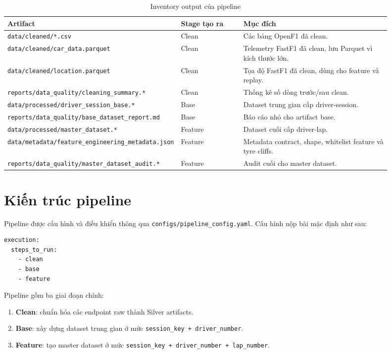 \documentclass[conference]{IEEEtran}
\begin{document}
\begin{table}[htbp]
\caption{Inventory output của pipeline}
\label{tab:outputs}
\centering
\begin{tabular}{p{0.28\linewidth}p{0.18\linewidth}p{0.44\linewidth}}
\toprule
Artifact & Stage tạo ra & Mục đích \\
\midrule
\texttt{data/cleaned/*.csv} & Clean & Các bảng OpenF1 đã clean. \\
\texttt{data/cleaned/car\_data.parquet} & Clean & Telemetry FastF1 đã clean, lưu Parquet vì kích thước lớn. \\
\texttt{data/cleaned/location.parquet} & Clean & Tọa độ FastF1 đã clean, dùng cho feature và replay. \\
\texttt{reports/data\_quality/cleaning\_summary.*} & Clean & Thống kê số dòng trước/sau clean. \\
\texttt{data/processed/driver\_session\_base.*} & Base & Dataset trung gian cấp driver-session. \\
\texttt{reports/data\_quality/base\_dataset\_report.md} & Base & Báo cáo nhỏ cho artifact base. \\
\texttt{data/processed/master\_dataset.*} & Feature & Dataset cuối cấp driver-lap. \\
\texttt{data/metadata/feature\_engineering\_metadata.json} & Feature & Metadata contract, shape, whitelist feature và tyre cliffs. \\
\texttt{reports/data\_quality/master\_dataset\_audit.*} & Feature & Audit cuối cho master dataset. \\
\bottomrule
\end{tabular}
\end{table}

\section{Kiến trúc pipeline}

Pipeline được cấu hình và điều khiển thông qua \texttt{configs/pipeline\_config.yaml}. Cấu hình nộp bài mặc định như sau:

\begin{lstlisting}
execution:
  steps_to_run:
    - clean
    - base
    - feature
\end{lstlisting}

Pipeline gồm ba giai đoạn chính:

\begin{enumerate}[nosep]
    \item \textbf{Clean}: chuẩn hóa các endpoint raw thành Silver artifacts.
    \item \textbf{Base}: xây dựng dataset trung gian ở mức \texttt{session\_key + driver\_number}.
    \item \textbf{Feature}: tạo master dataset ở mức \texttt{session\_key + driver\_number + lap\_number}.
\end{enumerate}
\end{document}
